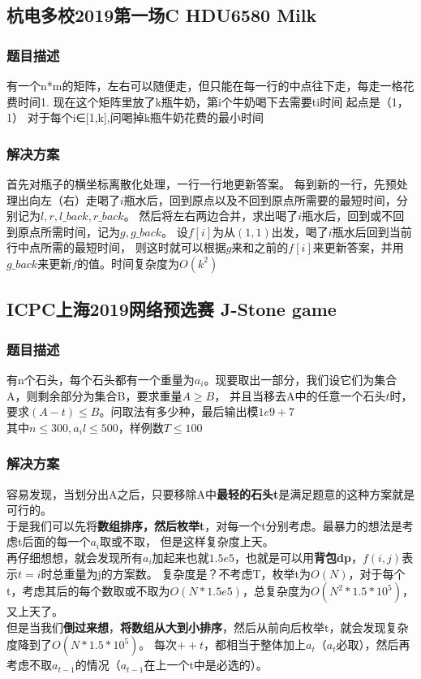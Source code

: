 \subsection{杭电多校2019第一场C HDU6580 Milk}
    \subsubsection{题目描述}
        有一个n*m的矩阵，左右可以随便走，但只能在每一行的中点往下走，每走一格花费时间1.
        现在这个矩阵里放了k瓶牛奶，第i个牛奶喝下去需要ti时间
        起点是（1，1）
        对于每个i∈[1,k],问喝掉k瓶牛奶花费的最小时间
    \subsubsection{解决方案}
        首先对瓶子的横坐标离散化处理，一行一行地更新答案。
        每到新的一行，先预处理出向左（右）走喝了\(i\)瓶水后，回到原点以及不回到原点所需要的最短时间，分别记为\(l,r,l\_back,r\_back\)。
        然后将左右两边合并，求出喝了\(i\)瓶水后，回到或不回到原点所需时间，记为\(g,g\_back\)。
        设\(f[i]\)为从\((1,1)\)出发，喝了\(i\)瓶水后回到当前行中点所需的最短时间，
        则这时就可以根据\(g\)来和之前的\(f[i]\)来更新答案，并用\(g\_back\)来更新\(f\)的值。时间复杂度为\(O(k^2)\)

\subsection{ICPC上海2019网络预选赛 J-Stone game}
    \subsubsection{题目描述}
        有n个石头，每个石头都有一个重量为$a_i$。现要取出一部分，我们设它们为集合A，则剩余部分为集合B，要求重量$A\ge B$，
        并且当移去A中的任意一个石头$t$时，要求$(A-t)\le B$。问取法有多少种，最后输出模$1e9+7$\\
        其中$n\le 300, a_il\le 500$，样例数$T\le 100$
    \subsubsection{解决方案}
        容易发现，当划分出A之后，只要移除A中\textbf{最轻的石头t}是满足题意的这种方案就是可行的。\\
        于是我们可以先将\textbf{数组排序，然后枚举t}，对每一个t分别考虑。最暴力的想法是考虑t后面的每一个$a_i$取或不取，
        但是这样复杂度上天。\\
        再仔细想想，就会发现所有$a_i$加起来也就$1.5e5$，也就是可以用\textbf{背包dp}，$f(i,j)$表示$t=i$时总重量为j的方案数。
        复杂度是？不考虑T，枚举t为$O(N)$，对于每个t，考虑其后的每个数取或不取为$O(N*1.5e5)$，总复杂度为$O(N^2*1.5*10^5)$，又上天了。\\
        但是当我们\textbf{倒过来想}，\textbf{将数组从大到小排序}，然后从前向后枚举t，就会发现复杂度降到了$O(N*1.5*10^5)$。
        每次$++t$，都相当于整体加上$a_t$（$a_t$必取），然后再考虑不取$a_{t-1}$的情况（$a_{t-1}$在上一个t中是必选的）。